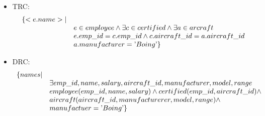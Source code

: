 \begin{exercise}{8}

\begin{subexercise}
  \begin{itemize}
  \item TRC:
    \begin{displaymath}
      \begin{array}{l l}
        \{ <e.name> | & \\
            & e\in employee \land \exists c \in certified \land \exists a \in arcraft \\
            & e.emp\_id = c.emp\_id \land c.aircraft\_id = a.aircraft\_id \\
            & a.manufacturer = \text{'}Boing\text{'} \}
      \end{array}
    \end{displaymath}
  \item DRC:
    \begin{displaymath}
      \begin{array}{l l}
        \{ names | & \\
              & \exists emp\_id, name, salary, aircraft\_id, manufacturer, model, range \\
              & employee(emp\_id, name, salary) \land certified(emp\_id, aircraft\_id) \land  \\
              & aircraft( aircraft\_id, manufacturerer, model, range) \land \\
              & manufactuer = \text{'}Boing\text{'} \}
               
      \end{array}
    \end{displaymath}
  \end{itemize}
\end{subexercise}


\end{exercise}
